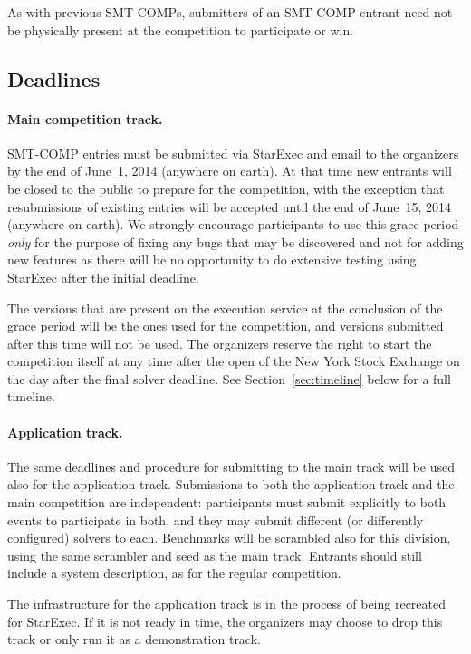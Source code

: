 \documentclass[12pt]{article}
\begin{document}
As with previous SMT-COMPs, submitters of an SMT-COMP entrant need not 
be physically present at the competition to
participate or win.

\subsection*{Deadlines} %


\paragraph{Main competition track.} %
SMT-COMP entries must be submitted via StarExec and email to the organizers by the end of June~1, 2014 (anywhere on earth).  At that time new entrants will be
closed to the public to prepare for the competition, with the
exception that resubmissions of existing entries will be accepted
until the end of June~15, 2014 (anywhere on earth).  We strongly encourage
participants to use this grace period \emph{only} for the
purpose of fixing any bugs that may be discovered and not for adding
new features as there will be no opportunity to do extensive testing
using StarExec after the initial deadline.

The versions that are present on the execution service at the conclusion of the
grace period will be the ones used for the competition, and versions
submitted after this time will not be used.  The organizers reserve
the right to start the competition itself at any time after the open
of the New York Stock Exchange on the day after the final solver deadline.  See
Section~\ref{sec:timeline} below for a full timeline.

\paragraph{Application track.} %
The same deadlines and procedure for submitting to the main track will be used
also for the application track. Submissions to both the application track and
the main competition are independent: participants must submit explicitly to
both events to participate in both, and they may submit different (or
differently configured) solvers to each.  Benchmarks will be scrambled also
for this division, using the same scrambler and seed as the main track.
Entrants should still include a system description, as for the regular
competition.

The infrastructure for the application track is in the process of being recreated for StarExec.
If it is not ready in time, the organizers may choose to drop this track or only run it as a demonstration track.
\end{document}
